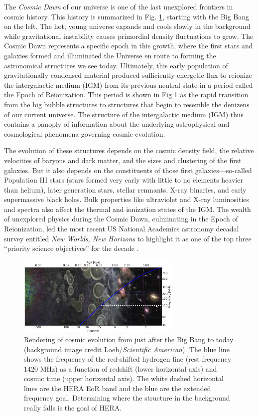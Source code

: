 \documentclass[preprint,11pt]{aastex}
\begin{document}
\noindent The {\it Cosmic Dawn} of our universe is one of the last unexplored
frontiers in cosmic history.  This history is summarized in Fig. \ref{fig:cosmos}, starting with the Big Bang on the left. The hot, young universe expands and cools slowly in the background while gravitational instability causes primordial density fluctuations to grow.
The Cosmic Dawn represents a specific epoch in this growth, where the first stars and galaxies formed and illuminated the Universe en route to forming the astronomical structures we see today. Ultimately, this early population of gravitationally condensed material produced sufficiently energetic flux to reionize the intergalactic medium (IGM) from its previous neutral state in a period called the Epoch of Reionization.  This period is shown in Fig \ref{fig:cosmos} as the rapid transition from the big bubble structures to structures that begin to resemble the denizens of our current universe. The structure of the 
intergalactic medium (IGM) thus contains a panoply of information about the underlying astrophysical and cosmological phenomena governing cosmic evolution.

The evolution of these structures depends on the cosmic density field, the relative velocities of
baryons and dark matter, and the sizes and clustering of the first galaxies.
But it also depends on the constituents of those first galaxies---so-called Population
III stars (stars formed very early with little to no elements heavier than helium), later generation stars, stellar remnants, X-ray binaries,
and early supermassive black holes.  Bulk properties like
ultraviolet and X-ray luminosities and spectra also affect the thermal and
ionization states of the IGM.  The wealth of unexplored physics during the Cosmic Dawn,
culminating in the Epoch of Reionization, 
led the most recent US National Academies astronomy decadal survey entitled {\em New Worlds, New Horizons} to highlight it as one of the top three ``priority science objectives'' for
the decade \citep{NWNH}.

\begin{figure}[h!]
	\centering
	\includegraphics[width=0.7\textwidth]{plots/cosmicEvo.png}
	\caption{Rendering of cosmic evolution from just after the Big Bang to today (background image credit Loeb/{\em Scientific American}).  The blue line shows the frequency of the red-shifted hydrogen line (rest frequency 1420 MHz) as a function of redshift (lower horizontal axis) and cosmic time (upper horizontal axis).  The white dashed horizontal lines are the HERA EoR band and the blue are the extended frequency goal.  Determining where the structure in the background really falls is the
goal of HERA.} 
	\label{fig:cosmos}
\end{figure}
\end{document}
